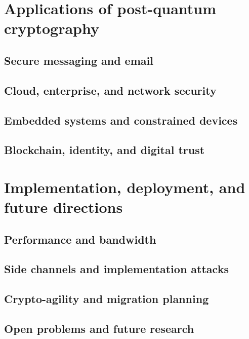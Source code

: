 \chapter{Applications of post-quantum cryptography}
\section{Secure messaging and email}
\section{Cloud, enterprise, and network security}
\section{Embedded systems and constrained devices}
\section{Blockchain, identity, and digital trust}

\chapter{Implementation, deployment, and future directions}
\section{Performance and bandwidth}
\section{Side channels and implementation attacks}
\section{Crypto-agility and migration planning}
\section{Open problems and future research}
